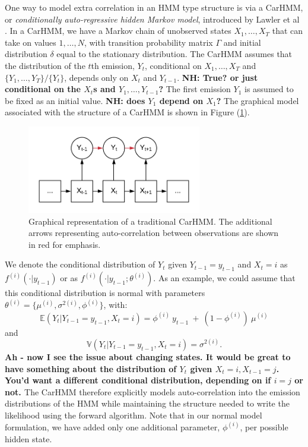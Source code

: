 One way to model extra correlation in an HMM type structure is via a CarHMM, or \textit{conditionally auto-regressive hidden Markov model}, introduced by Lawler et al \cite{Lawler:2019}. 
In a CarHMM, we have a Markov chain of unobserved states $X_1,\ldots, X_T$ that can take on values $1, \ldots, N$, with transition probability matrix $\Gamma$ and initial distribution $\delta$ equal to the stationary distribution.
The CarHMM assumes that the distribution of the $t$th emission, $Y_t$, conditional on $X_1,\ldots, X_T$ and $ \{Y_1,\ldots, Y_T\}/\{Y_t\}$, depends only on $X_t$ and $Y_{t-1}$. 
{\bf{NH:  True?  or just conditional on the $X_t$s and $Y_1,\ldots, Y_{t-1}$?}}
The first emission $Y_1$ is assumed to be fixed as an initial value.
%
{\bf{NH: does $Y_1$ depend on $X_1$?}}
%
 The graphical model associated with the structure of a CarHMM is shown in Figure (\ref{fig:CarHMM}).

\begin{figure}[h!]
	\centering
	\includegraphics[width=3in]{../Plots/CarHMM.png}
	\caption{Graphical representation of a traditional CarHMM. The additional arrows representing auto-correlation between observations are shown in red for emphasis.}
	\label{fig:CarHMM}
\end{figure}

%
We denote the conditional distribution of $Y_t$ given $Y_{t-1}= y_{t-1}$ and $ X_t=i$ as $f^{(i)}( \cdot | y_{t-1})$ or as
$f^{(i)}( \cdot | y_{t-1}; \theta^{(i)})$.
As an example, we could assume that this conditional distribution is normal with parameters $\theta^{(i)} = \{\mu^{(i)},\sigma^{2(i)},\phi^{(i)}\}$, with:
%
\[
\mathbb{E}(Y_t|Y_{t-1} = y_{t-1},X_t=i) = \phi^{(i)} ~ y_{t-1} ~+ ~(1-\phi^{(i)})  ~\mu^{(i)}
\]
and
\[
\mathbb{V}(Y_t| Y_{t-1} =y_{t-1}, X_t = i) = \sigma^{2(i)}.
\]
%
{\bf{Ah - now I see the issue about changing states.  It would be great to have something about the distribution of $Y_t$ given $X_t=i, X_{t-1}=j$. You'd want a different conditional distribution, depending on if $i=j$ or not.
}}
%
The CarHMM therefore explicitly models auto-correlation into the emission distributions of the HMM while maintaining the structure needed to write the likelihood using the forward algorithm. Note that in our normal model formulation,  we have added only one additional parameter, $\phi^{(i)}$,  per possible hidden state. 

